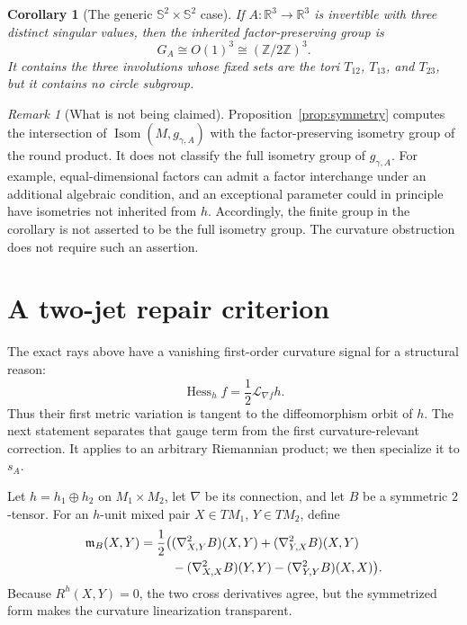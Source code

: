 \documentclass[11pt]{amsart}
\newtheorem{corollary}[theorem]{Corollary}
\theoremstyle{definition}
\theoremstyle{remark}
\newtheorem{remark}[theorem]{Remark}
\DeclareMathOperator{\Hess}{Hess}
\DeclareMathOperator{\Isom}{Isom}
\newcommand{\R}{\mathbb R}
\newcommand{\Sph}{\mathbb S}
\begin{document}
\begin{corollary}[The generic $\Sph^2\times\Sph^2$ case]
If $A:\R^3\to\R^3$ is invertible with three distinct singular values,
then the inherited factor-preserving group is
\[
 G_A\cong O(1)^3\cong(\mathbb Z/2\mathbb Z)^3.
\]
It contains the three involutions whose fixed sets are the tori
$T_{12}$, $T_{13}$, and $T_{23}$, but it contains no circle subgroup.
\end{corollary}

\begin{remark}[What is not being claimed]
Proposition~\ref{prop:symmetry} computes the intersection of
$\Isom(M,g_{\gamma,A})$ with the factor-preserving isometry group of
the round product.  It does not classify the full isometry group of
$g_{\gamma,A}$.  For example, equal-dimensional factors can admit a
factor interchange under an additional algebraic condition, and an
exceptional parameter could in principle have isometries not inherited
from $h$.  Accordingly, the finite group in the corollary is not
asserted to be the full isometry group.  The curvature obstruction does
not require such an assertion.
\end{remark}

\section{A two-jet repair criterion}\label{sec:two-jet}

The exact rays above have a vanishing first-order curvature signal for
a structural reason:
\begin{equation}\label{eq:hessian-lie}
 \Hess_h f=\frac12\mathcal L_{\nabla f}h.
\end{equation}
Thus their first metric variation is tangent to the diffeomorphism
orbit of $h$.  The next statement separates that gauge term from the
first curvature-relevant correction.  It applies to an arbitrary
Riemannian product; we then specialize it to $s_A$.

Let $h=h_1\oplus h_2$ on $M_1\times M_2$, let $\nabla$ be its
connection, and let $B$ be a symmetric $2$-tensor.  For an $h$-unit
mixed pair $X\in TM_1$, $Y\in TM_2$, define
\begin{align}
 \mathfrak m_B(X,Y)=\frac12\big(&
  (\nabla^2_{X,Y}B)(X,Y)+(\nabla^2_{Y,X}B)(X,Y)\notag\\
 &-(\nabla^2_{X,X}B)(Y,Y)
  -(\nabla^2_{Y,Y}B)(X,X)\big).
 \label{eq:mixed-jet-functional}
\end{align}
Because $R^h(X,Y)=0$, the two cross derivatives agree, but the
symmetrized form makes the curvature linearization transparent.
\end{document}
